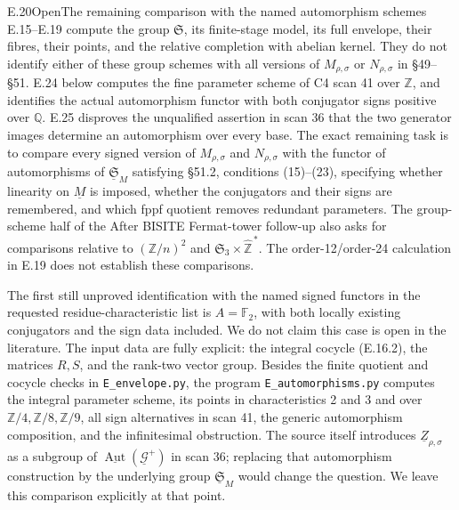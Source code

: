 \begin{statement}{E.20}{Open}{The remaining comparison with the named automorphism schemes}
E.15--E.19 compute the group \(\mathfrak S\), its finite-stage
model, its full envelope, their fibres, their points, and the
relative completion with abelian kernel.  They do not identify
either of these group schemes with all versions of
\(M_{\rho,\sigma}\) or \(N_{\rho,\sigma}\) in \S49--\S51.
E.24 below computes the fine parameter scheme of C4 scan 41
over \(\mathbb Z\), and identifies the actual automorphism functor
with both conjugator signs positive over \(\mathbb Q\).
E.25 disproves the unqualified assertion in scan 36 that the two
generator images determine an automorphism over every base.
The exact remaining task is to compare every signed version of
\(M_{\rho,\sigma}\) and \(N_{\rho,\sigma}\) with the functor of
automorphisms of \(\underline{\mathfrak S}_M\) satisfying
\S51.2, conditions (15)--(23), specifying whether linearity on
\(\underline M\) is imposed, whether the conjugators and their
signs are remembered, and which fppf quotient removes redundant
parameters.
The group-scheme half of the After BISITE Fermat-tower follow-up
also asks for comparisons relative to
\((\mathbb Z/n)^2\) and
\(\mathfrak S_3\times\widehat{\mathbb Z}^{\,*}\).
The order-12/order-24 calculation in E.19 does not establish
these comparisons.
\end{statement}
\noindent
The first still unproved identification with the named signed
functors in the requested residue-characteristic list is
\(A=\mathbb F_2\), with both locally existing conjugators and
the sign data included.  We do not claim this case is open in
the literature.  The input data are fully explicit:
the integral cocycle (E.16.2), the matrices \(R,S\), and the
rank-two vector group.  Besides the finite quotient and cocycle
checks in \texttt{E\_envelope.py}, the program
\texttt{E\_automorphisms.py} computes the integral parameter
scheme, its points in characteristics 2 and 3 and over
\(\mathbb Z/4,\mathbb Z/8,\mathbb Z/9\), all sign alternatives
in scan 41, the generic automorphism composition, and the
infinitesimal obstruction.  The source itself introduces
\(\underline Z_{\rho,\sigma}\) as a subgroup of
\(\underline{\operatorname{Aut}}(\underline{\mathcal G}^{+})\)
in scan 36; replacing that automorphism construction by the
underlying group \(\underline{\mathfrak S}_M\) would change the
question.  We leave this comparison explicitly at that point.

